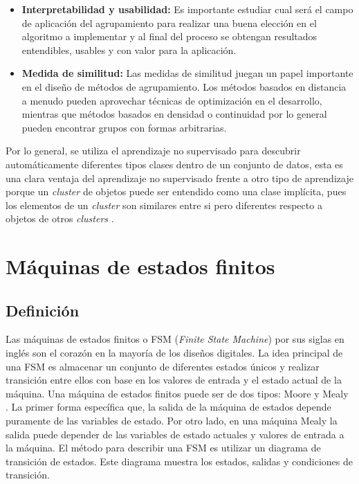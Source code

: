 \begin{itemize}
    \item \textbf{Interpretabilidad y usabilidad:} Es importante estudiar cual será el campo de aplicación del agrupamiento para realizar una buena elección en el algoritmo a implementar y al final del proceso se obtengan resultados entendibles, usables y con valor para la aplicación.
    
    \item \textbf{Medida de similitud:} Las medidas de similitud juegan un papel importante en el diseño de métodos de agrupamiento. Los métodos basados en distancia a menudo pueden aprovechar técnicas de optimización en el desarrollo, mientras que métodos basados en densidad o continuidad por lo general pueden encontrar grupos con formas arbitrarias.
\end{itemize}

Por lo general, se utiliza el aprendizaje no supervisado para descubrir automáticamente diferentes tipos clases dentro de un conjunto de datos, esta es una clara ventaja del aprendizaje no supervisado frente a otro tipo de aprendizaje porque un \textit{cluster} de objetos puede ser entendido como una clase implícita, pues los elementos de un \textit{cluster} son similares entre si pero diferentes respecto a objetos de otros \textit{clusters} \cite{han2011data}. 

\section{Máquinas de estados finitos} \label{sec:máquinas_de_estados_finitos}

\subsection{Definición} \label{sub:definición}

Las máquinas de estados finitos o FSM (\textit{Finite State Machine}) por sus siglas en inglés son el corazón en la mayoría de los diseños digitales. La idea principal de una FSM es almacenar un conjunto de diferentes estados únicos y realizar transición entre ellos con base en los valores de entrada y el estado actual de la máquina. Una máquina de estados finitos puede ser de dos tipos: Moore y Mealy \cite{wilson2013model}. La primer forma específica que, la salida de la máquina de estados depende puramente de las variables de estado. Por otro lado, en una máquina Mealy la salida puede depender de las variables de estado actuales y valores de entrada a la máquina. El método para describir una FSM es utilizar un diagrama de transición de estados. Este diagrama muestra los estados, salidas y condiciones de transición.

